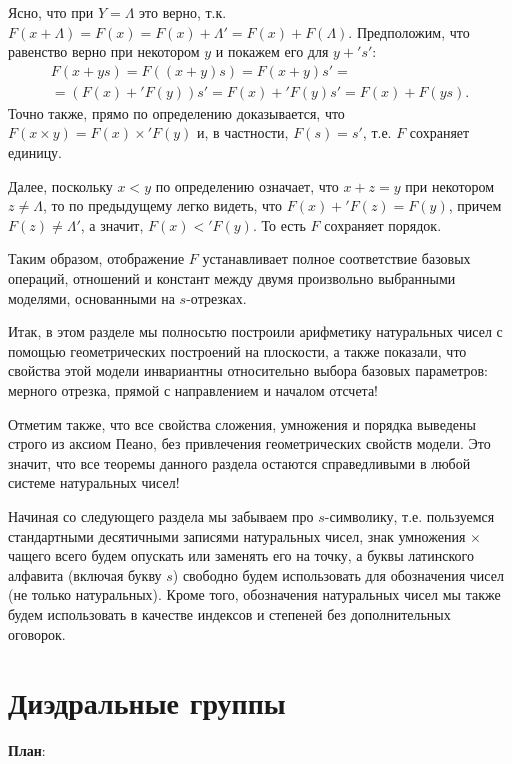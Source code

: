 Ясно, что при $Y=\Lambda$ это верно, т.к. $F(x+\Lambda)=F(x)=F(x)+\Lambda'=F(x)+F(\Lambda)$. Предположим, что равенство верно при некотором $y$ и покажем его для $y+'s'$:
\begin{multline*}
F(x+ys)=F((x+y)s)=F(x+y)s'=\\
=(F(x)+'F(y))s'=F(x)+'F(y)s'=F(x)+F(ys).
\end{multline*}
Точно также, прямо по определению доказывается, что $F(x\times y)=F(x)\times'F(y)$ и, в частности, $F(s)=s'$, т.е. $F$ сохраняет единицу.

Далее, поскольку $x<y$ по определению означает, что $x+z=y$ при некотором $z\ne\Lambda$, то по предыдущему легко видеть, что $F(x)+'F(z)=F(y)$, причем $F(z)\ne\Lambda'$, а значит, $F(x)<'F(y)$. То есть $F$ сохраняет порядок.

Таким образом, отображение $F$ устанавливает полное соответствие базовых операций, отношений и констант между двумя произвольно выбранными моделями, основанными на $s$-отрезках.
\epf

Итак, в этом разделе мы полносьтю построили арифметику натуральных чисел с помощью геометрических построений на плоскости, а также показали, что свойства этой модели инвариантны относительно выбора базовых параметров: мерного отрезка, прямой с направлением и началом отсчета!

Отметим также, что все свойства сложения, умножения и порядка выведены строго из аксиом Пеано, без привлечения геометрических свойств модели. Это значит, что все теоремы данного раздела остаются справедливыми в любой системе натуральных чисел!

 Начиная со следующего раздела мы забываем про $s$-символику, т.е. пользуемся стандартными десятичными записями натуральных чисел, знак умножения $\times$ чащего всего будем опускать или заменять его на точку, а буквы латинского алфавита (включая букву $s$) свободно будем использовать для обозначения чисел (не только натуральных). Кроме того, обозначения натуральных чисел мы также будем использовать в качестве индексов и степеней без дополнительных оговорок.



\section{Диэдральные группы}


\textbf{План}:

